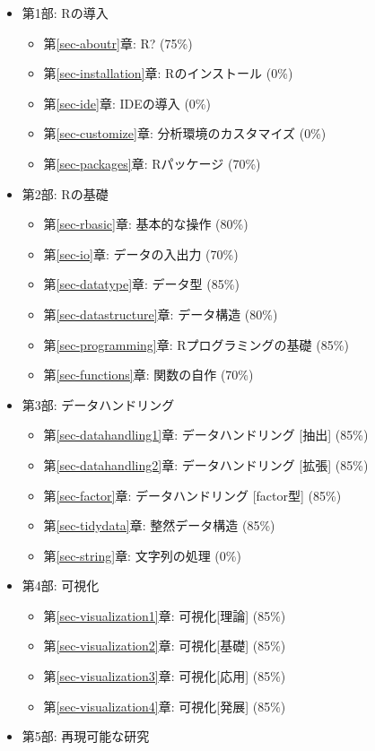 \documentclass[
  a4paper,
  pandoc,
  ja=standard,
  jafont=haranoaji]{bxjsbook}
\providecommand{\tightlist}{%
  \setlength{\itemsep}{0pt}\setlength{\parskip}{0pt}}
\begin{document}
\begin{itemize}
\tightlist
\item
  第1部: Rの導入

  \begin{itemize}
  \tightlist
  \item
    第\ref{sec-aboutr}章: R? (75\%)
  \item
    第\ref{sec-installation}章: Rのインストール (0\%)
  \item
    第\ref{sec-ide}章: IDEの導入 (0\%)
  \item
    第\ref{sec-customize}章: 分析環境のカスタマイズ (0\%)
  \item
    第\ref{sec-packages}章: Rパッケージ (70\%)
  \end{itemize}
\item
  第2部: Rの基礎

  \begin{itemize}
  \tightlist
  \item
    第\ref{sec-rbasic}章: 基本的な操作 (80\%)
  \item
    第\ref{sec-io}章: データの入出力 (70\%)
  \item
    第\ref{sec-datatype}章: データ型 (85\%)
  \item
    第\ref{sec-datastructure}章: データ構造 (80\%)
  \item
    第\ref{sec-programming}章: Rプログラミングの基礎 (85\%)
  \item
    第\ref{sec-functions}章: 関数の自作 (70\%)
  \end{itemize}
\item
  第3部: データハンドリング

  \begin{itemize}
  \tightlist
  \item
    第\ref{sec-datahandling1}章: データハンドリング {[}抽出{]} (85\%)
  \item
    第\ref{sec-datahandling2}章: データハンドリング {[}拡張{]} (85\%)
  \item
    第\ref{sec-factor}章: データハンドリング {[}factor型{]} (85\%)
  \item
    第\ref{sec-tidydata}章: 整然データ構造 (85\%)
  \item
    第\ref{sec-string}章: 文字列の処理 (0\%)
  \end{itemize}
\item
  第4部: 可視化

  \begin{itemize}
  \tightlist
  \item
    第\ref{sec-visualization1}章: 可視化{[}理論{]} (85\%)
  \item
    第\ref{sec-visualization2}章: 可視化{[}基礎{]} (85\%)
  \item
    第\ref{sec-visualization3}章: 可視化{[}応用{]} (85\%)
  \item
    第\ref{sec-visualization4}章: 可視化{[}発展{]} (85\%)
  \end{itemize}
\item
  第5部: 再現可能な研究


\end{itemize}
\end{document}
